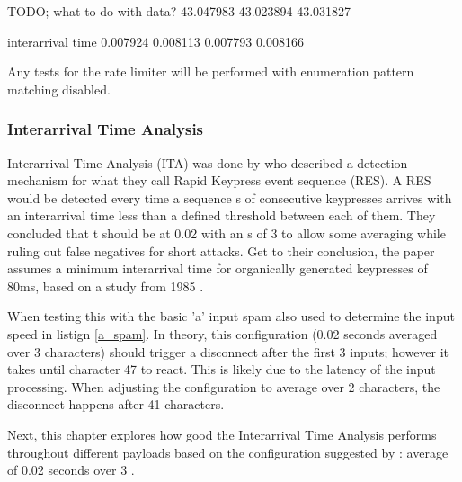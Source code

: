 TODO; what to do with data?
43.047983
43.023894
43.031827

interarrival time
0.007924
0.008113
0.007793
0.008166

Any tests for the rate limiter will be performed with enumeration pattern matching disabled. 


\subsubsection{Interarrival Time Analysis}


Interarrival Time Analysis (ITA) was done by \cite{neunerUSBlockBlockingUSBBased2018} who described a detection mechanism for what they call Rapid Keypress event sequence (RES). A RES would be detected every time a sequence s of consecutive keypresses arrives with an interarrival time less than a defined threshold between each of them. They concluded that t should be at 0.02 with an s of 3 to allow some averaging while ruling out false negatives for short attacks. Get to their conclusion, the paper assumes a minimum interarrival time for organically generated keypresses of 80ms, based on a study from 1985 \cite{umphressIdentityVerificationKeyboard1985}. 

When testing this with the basic 'a' input spam also used to determine the input speed in listign \ref{a_spam}. In theory, this configuration (0.02 seconds averaged over 3 characters) should trigger a disconnect after the first 3 inputs; however it takes until character 47 to react. This is likely due to the latency of the input processing. When adjusting the configuration to average over 2 characters, the disconnect happens after 41 characters.

Next, this chapter explores how good the Interarrival Time Analysis performs throughout different payloads based on the configuration suggested by \cite{neunerUSBlockBlockingUSBBased2018}: average of 0.02 seconds over 3 . 

